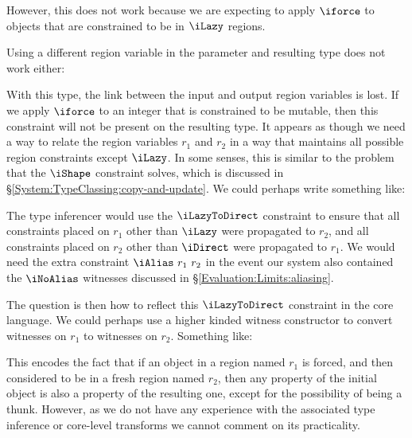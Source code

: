 
However, this does not work because we are expecting to apply $\iforce$ to objects that are constrained to be in $\iLazy$ regions. 

\clearpage{}
Using a different region variable in the parameter and resulting type does not work either:


With this type, the link between the input and output region variables is lost. If we apply $\iforce$ to an integer that is constrained to be mutable, then this constraint will not be present on the resulting type. It appears as though we need a way to relate the region variables $r_1$ and $r_2$ in a way that maintains all possible region constraints except $\iLazy$. In some senses, this is similar to the problem that the $\iShape$ constraint solves, which is discussed in \S\ref{System:TypeClassing:copy-and-update}. We could perhaps write something like:


The type inferencer would use the $\iLazyToDirect$ constraint to ensure that all constraints placed on $r_1$ other than $\iLazy$ were propagated to $r_2$, and all constraints placed on $r_2$ other than $\iDirect$ were propagated to $r_1$. We would need the extra constraint $\iAlias \ r_1 \ r_2$ in the event our system also contained the $\iNoAlias$ witnesses discussed in \S\ref{Evaluation:Limits:aliasing}.

The question is then how to reflect this $\iLazyToDirect$ constraint in the core language. We could perhaps use a higher kinded witness constructor to convert witnesses on $r_1$ to witnesses on $r_2$. Something like:


This encodes the fact that if an object in a region named $r_1$ is forced, and then considered to be in a fresh region named $r_2$, then any property of the initial object is also a property of the resulting one, except for the possibility of being a thunk. However, as we do not have any experience with the associated type inference or core-level transforms we cannot comment on its practicality.

